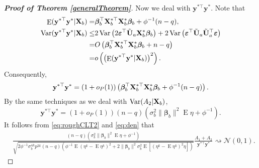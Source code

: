 \documentclass[11pt]{article}
\DeclareMathOperator{\myE}{E}
\DeclareMathOperator{\myVar}{Var}
\newcommand{\By}{\mathbf{y}}    \newcommand{\Bz}{\mathbf{z}}
\newcommand{\bfsym}[1]{\ensuremath{\boldsymbol{#1}}}
\def\bbeta{\bfsym \beta}
\theoremstyle{plain}
\theoremstyle{definition}
\theoremstyle{remark}
\begin{document}
\begin{appendices}
\begin{proof}[\textbf{Proof of Theorem \ref{generalTheorem}}]
Now we deal with $\By^{*\top} \By^*$.
Note that
\begin{equation*}
    \begin{split}
        \myE (\By^{*\top} \By^* |\BX_b ) =& \bbeta_b^\top \BX_b^{*\top}  \BX_b^* \bbeta_b
    + \phi^{-1}(n-q),
    \\
    \myVar ( \By^{*\top} \By^* |\BX_b ) 
    \leq  &
    2\myVar \left( 2 \bepsilon^\top \tilde{\BU}_a  \BX_b^{*} \bbeta_b \right) + 2\myVar \left( \bepsilon^\top  \tilde{\BU}_a \tilde{\BU}_a^\top \bepsilon \right)
    \\
    =&O\left( 
        \bbeta_b^\top \BX_b^{*\top}  \BX_b^* \bbeta_b 
+ n-q\right)
\\
=&o\left( \left( \myE (\By^{*\top} \By^* |\BX_b ) \right)^2 \right).
    \end{split}
\end{equation*}
Consequently,
\begin{equation*}
    \By^{*\top} \By^* = (1+o_P(1))
    \left( 
        \bbeta_b^\top \BX_b^{*\top} \BX_b^* \bbeta_b
    + \phi^{-1}(n-q)
\right).
\end{equation*}
By the same techniques as we deal with $\myVar (A_2 |\BX_b)$,
\begin{equation}\label{eq:den}
        \By^{*\top} \By^*
        =
        (1+o_P(1))(n-q)\left(
        \sigma_b^2 \|\bbeta_b\|^2  \myE \eta
+\phi^{-1}
\right)
    .
    \end{equation}
It follows from \eqref{eq:roughCLT2} and \eqref{eq:den} that
    \begin{equation}\label{eq:roughCLT3}
        \begin{split}
    &
    \frac{
        (n-q)\left(
        \sigma_b^2 \|\bbeta_b\|^2  \myE \eta
+\phi^{-1}
\right)
    }{\sqrt{
            2\phi^{-1}
            \sigma_b^{4k} p^{2k}
            (n-q)
            \left( 
                \phi^{-1} \myE (\eta^k - \myE \eta^k)^2
                +
                2\|\bbeta_b\|^2 \sigma_b^2 \myE [(\eta^k - \myE \eta^k)^2\eta]
            \right)
    }}
    \frac{
        A_1+A_2
    }{\By^{*\top} \By^*}
    \rightsquigarrow \mathcal N(0,1).
        \end{split}
    \end{equation}


\end{proof}
\end{appendices}
\end{document}
